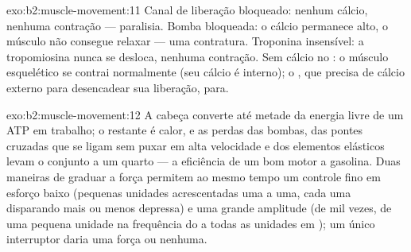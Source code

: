 \begin{solution}{exo:b2:muscle-movement:11}
Canal de liberação bloqueado: nenhum cálcio, nenhuma contração ---
paralisia. Bomba bloqueada: o cálcio permanece alto, o músculo não
consegue relaxar --- uma contratura. Troponina insensível: a
tropomiosina nunca se desloca, nenhuma contração. Sem cálcio no :
o músculo esquelético se contrai normalmente (seu cálcio é interno); o
, que precisa de cálcio externo para desencadear sua liberação,
para.
\end{solution}

\begin{solution}{exo:b2:muscle-movement:12}
A cabeça converte até metade da energia livre de um ATP em trabalho; o
restante é calor, e as perdas das bombas, das pontes cruzadas que se
ligam sem puxar em alta velocidade e dos elementos elásticos levam o
conjunto a um quarto --- a eficiência de um bom motor a gasolina. Duas
maneiras de graduar a força permitem ao mesmo tempo um controle fino
em esforço baixo (pequenas unidades acrescentadas uma a uma, cada uma
disparando mais ou menos depressa) e uma grande amplitude (de mil
vezes, de uma pequena unidade na frequência do  a todas as unidades
em ); um único interruptor daria uma força ou nenhuma.
\end{solution}

